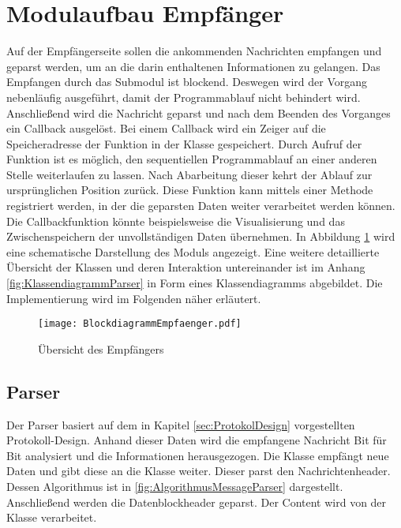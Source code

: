 \section{Modulaufbau Empf{\"a}nger}

Auf der Empf{\"a}ngerseite sollen die ankommenden Nachrichten empfangen und geparst
werden, um an die darin enthaltenen Informationen zu gelangen. Das Empfangen
durch das Submodul  ist blockend. Deswegen wird der Vorgang
nebenl{\"a}ufig ausgef{\"u}hrt, damit der Programmablauf nicht behindert wird.
Anschließend wird die Nachricht geparst und nach dem Beenden des Vorganges ein Callback
ausgel{\"o}st. Bei einem Callback wird ein Zeiger auf die Speicheradresse der
Funktion in der Klasse gespeichert. Durch Aufruf der Funktion ist es
m{\"o}glich, den sequentiellen Programmablauf an einer anderen Stelle
weiterlaufen zu lassen. Nach Abarbeitung dieser kehrt der Ablauf zur
urspr{\"u}nglichen Position zur{\"u}ck. Diese Funktion kann mittels einer
Methode registriert werden, in der die geparsten Daten weiter verarbeitet werden
k{\"o}nnen.
Die Callbackfunktion k{\"o}nnte beispielsweise die Visualisierung und das
Zwischenspeichern der unvollständigen Daten {\"u}bernehmen. \newline 
In Abbildung \ref{fig:BlockdiagrammEmpfaenger} wird eine schematische
Darstellung des Moduls angezeigt. Eine weitere detaillierte Übersicht der Klassen
und deren Interaktion untereinander ist im Anhang
\ref{fig:KlassendiagrammParser} in Form eines Klassendiagramms 
abgebildet.
Die Implementierung wird im Folgenden n{\"a}her erl{\"a}utert.

\begin{figure}[H]
\centering
\texttt{[image: BlockdiagrammEmpfaenger.pdf]}
\caption{{\"U}bersicht des Empf{\"a}ngers}
\label{fig:BlockdiagrammEmpfaenger}
\end{figure}

\subsection{Parser}

Der Parser basiert auf dem in Kapitel \ref{sec:ProtokolDesign}
vorgestellten Protokoll-Design.
Anhand dieser Daten wird die empfangene Nachricht Bit f{\"u}r Bit analysiert
und die Informationen herausgezogen. 
Die Klasse  empf{\"a}ngt neue Daten und gibt diese an
die Klasse  weiter. Dieser parst den Nachrichtenheader.
Dessen Algorithmus ist in \ref{fig:AlgorithmusMessageParser} dargestellt.
Anschlie{\ss}end werden die Datenblockheader geparst. Der Content wird von der
Klasse  verarbeitet.

